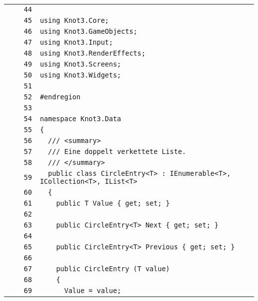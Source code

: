 \documentclass[a4paper,10pt]{article}
\begin{document}
\begin{longtable}[l]{lrrl}
\cellcolor{gray} &  & \verb~44~ & \verb~~\\
\cellcolor{gray} &  & \verb~45~ & \verb~using Knot3.Core;~\\
\cellcolor{gray} &  & \verb~46~ & \verb~using Knot3.GameObjects;~\\
\cellcolor{gray} &  & \verb~47~ & \verb~using Knot3.Input;~\\
\cellcolor{gray} &  & \verb~48~ & \verb~using Knot3.RenderEffects;~\\
\cellcolor{gray} &  & \verb~49~ & \verb~using Knot3.Screens;~\\
\cellcolor{gray} &  & \verb~50~ & \verb~using Knot3.Widgets;~\\
\cellcolor{gray} &  & \verb~51~ & \verb~~\\
\cellcolor{gray} &  & \verb~52~ & \verb~#endregion~\\
\cellcolor{gray} &  & \verb~53~ & \verb~~\\
\cellcolor{gray} &  & \verb~54~ & \verb~namespace Knot3.Data~\\
\cellcolor{gray} &  & \verb~55~ & \verb~{~\\
\cellcolor{gray} &  & \verb~56~ & \verb~  /// <summary>~\\
\cellcolor{gray} &  & \verb~57~ & \verb~  /// Eine doppelt verkettete Liste.~\\
\cellcolor{gray} &  & \verb~58~ & \verb~  /// </summary>~\\
\cellcolor{gray} &  & \verb~59~ & \verb~  public class CircleEntry<T> : IEnumerable<T>, ICollection<T>, IList<T>~\\
\cellcolor{gray} &  & \verb~60~ & \verb~  {~\\
\cellcolor{gray} &  & \verb~61~ & \verb~    public T Value { get; set; }~\\
\cellcolor{gray} &  & \verb~62~ & \verb~~\\
\cellcolor{gray} &  & \verb~63~ & \verb~    public CircleEntry<T> Next { get; set; }~\\
\cellcolor{gray} &  & \verb~64~ & \verb~~\\
\cellcolor{gray} &  & \verb~65~ & \verb~    public CircleEntry<T> Previous { get; set; }~\\
\cellcolor{gray} &  & \verb~66~ & \verb~~\\
\cellcolor{gray} &  & \verb~67~ & \verb~    public CircleEntry (T value)~\\
\cellcolor{gray} &  & \verb~68~ & \verb~    {~\\
\cellcolor{gray} &  & \verb~69~ & \verb~      Value = value;~\\

\end{longtable}
\end{document}
